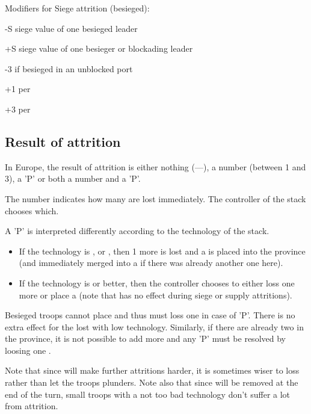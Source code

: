 Modifiers for Siege attrition (besieged):
\begin{modlist}
\item[-S] siege value of one besieged leader
\item[+S] siege value of one besieger or blockading leader
\item[-3] if besieged in an unblocked port
\item[+1] per \USURE\facemoins
\item[+3] per \USURE\faceplus
\end{modlist}

\subsection{Result of attrition}
In Europe, the result of attrition is either nothing (---), a number
(between 1 and 3), a 'P' or both a number and a 'P'.

The number indicates how many \LD are lost immediately. The controller of the
stack chooses which.

A 'P' is interpreted differently according to the technology of the stack.
\begin{itemize}
\item If the technology is \TMED, \TREN or \TARQ, then 1 more \LD is lost and
  a \PILLAGE\facemoins is placed into the province (and immediately merged
  into a \PILLAGE\faceplus if there was already another one here).
\item If the technology is \TMUS or better, then the controller chooses to
  either loss one more \LD or place a \PILLAGE\facemoins (note that
   has no effect during siege or supply attritions).
\end{itemize}

Besieged troops cannot place \PILLAGE and thus must loss one \LD in case of
'P'. There is no extra effect for the lost \PILLAGE with low
technology. Similarly, if there are already two \PILLAGE\faceplus in the
province, it is not possible to add more and any 'P' must be resolved by
loosing one \LD.

Note that since \PILLAGE will make further attritions harder, it is sometimes
wiser to loss \LD rather than let the troops plunders. Note also that since
\PILLAGE\facemoins will be removed at the end of the turn, small troops with a
not too bad technology don't suffer a lot from attrition.

